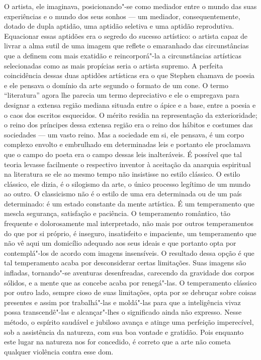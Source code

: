 O artista, ele imaginava, posicionando"-se como mediador entre o
mundo das suas experiências e o mundo dos seus sonhos --- \label{um"-mediador} um
mediador, consequentemente, dotado de dupla aptidão, uma aptidão
seletiva e uma aptidão reprodutiva.  Equacionar essas aptidões era o
segredo do sucesso artístico: o artista capaz de livrar a alma sutil de
uma imagem que reflete o emaranhado das circunstâncias que a definem
com mais exatidão e \label{reincorpora"-la} reincorporá"-la a circunstâncias artísticas
selecionadas como as mais propícias seria o artista supremo.  A
perfeita coincidência dessas duas aptidões artísticas era o que Stephen
chamava de poesia e ele pensava o domínio da arte segundo o formato de
um cone.  O termo “literatura” agora lhe parecia um termo depreciativo
e ele o empregava para designar a extensa região mediana situada entre
o ápice e a base, entre a poesia e o caos dos escritos esquecidos.  O
mérito residia na representação da exterioridade; o reino dos príncipes
dessa extensa região era o reino dos hábitos e costumes das \mbox{sociedades}
--- um vasto reino.  Mas a sociedade em si, ele pensava, é um corpo
complexo envolto e embrulhado em determinadas leis e portanto ele
proclamava que o campo do poeta era o campo dessas leis inalteráveis.
É possível que tal teoria levasse facilmente o respectivo inventor à
aceitação da anarquia espiritual na literatura se ele ao mesmo tempo
não insistisse no estilo clássico.  O estilo clássico, ele dizia, é o
silogismo da arte, o único processo legítimo de um mundo ao outro.  O
classicismo não é o estilo de uma era determinada ou de um país
determinado: é um estado constante da mente artística.  É um
temperamento que mescla segurança, satisfação e paciência.  O
temperamento romântico, tão frequente e dolorosamente mal interpretado,
não mais por outros temperamentos do que por si próprio, é inseguro,
insatisfeito e impaciente, um temperamento que não vê aqui um domicílio
adequado aos seus ideais e que portanto opta por contemplá"-los de
acordo com imagens insensíveis.  O resultado dessa opção é que tal
temperamento acaba por desconsiderar certas limitações.  Suas imagens
são infladas, tornando"-se aventuras desenfreadas, carecendo da
gravidade dos corpos sólidos, e a mente que as concebe acaba por
renegá"-las.  O temperamento clássico por outro lado, sempre cioso de
suas limitações, opta por se debruçar sobre coisas presentes e assim
por trabalhá"-las e moldá"-las para que a inteligência vivaz possa
transcendê"-las e alcançar"-lhes o significado ainda não expresso.  Nesse
método, o espírito saudável e jubiloso avança e atinge uma perfeição
imperecível, sob a assistência da natureza, com sua boa vontade e
gratidão.  \label{pois"-enquanto} Pois enquanto este lugar na natureza nos for concedido, é
correto que a arte não cometa qualquer violência contra esse dom.


